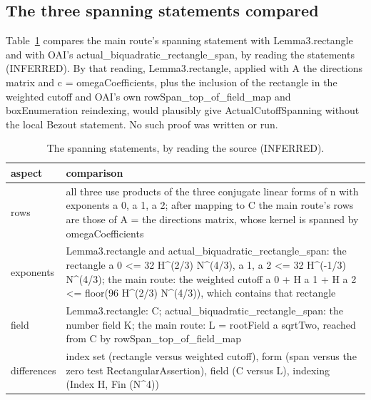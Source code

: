 \subsection{The three spanning statements compared}

Table~\ref{tab:spanning} compares the main route's spanning statement with Lemma3.rectangle and with OAI's actual\_biquadratic\_rectangle\_span, by reading the statements (INFERRED). %
By that reading, Lemma3.rectangle, applied with A the directions matrix and c = omegaCoefficients, plus the inclusion of the rectangle in the weighted cutoff and OAI's own rowSpan\_top\_of\_field\_map and boxEnumeration reindexing, would plausibly give ActualCutoffSpanning without the local Bezout statement. %
No such proof was written or run. %

\begin{table}[tbp]
\caption{The spanning statements, by reading the source (INFERRED).}\label{tab:spanning} %
\small
\begin{tabularx}{\textwidth}{@{}l>{\raggedright\arraybackslash}X@{}}
\toprule
aspect & comparison \\ %
\midrule
rows & all three use products of the three conjugate linear forms of n with exponents a 0, a 1, a 2; after mapping to C the main route's rows are those of A = the directions matrix, whose kernel is spanned by omegaCoefficients \\ %
exponents & Lemma3.rectangle and actual\_biquadratic\_rectangle\_span: the rectangle a 0 <= 32 H\textasciicircum(2/3) N\textasciicircum(4/3), a 1, a 2 <= 32 H\textasciicircum(-1/3) N\textasciicircum(4/3); the main route: the weighted cutoff a 0 + H a 1 + H a 2 <= floor(96 H\textasciicircum(2/3) N\textasciicircum(4/3)), which contains that rectangle \\ %
field & Lemma3.rectangle: C; actual\_biquadratic\_rectangle\_span: the number field K; the main route: L = rootField a sqrtTwo, reached from C by rowSpan\_top\_of\_field\_map \\ %
differences & index set (rectangle versus weighted cutoff), form (span versus the zero test RectangularAssertion), field (C versus L), indexing (Index H, Fin (N\textasciicircum4)) \\ %
\bottomrule
\end{tabularx}
\end{table}
